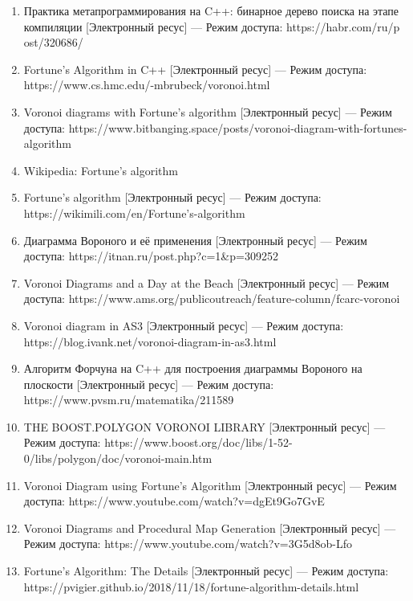 \documentclass[ a4paper]{article}
\begin{document}
\begin{enumerate}
\item Практика метапрограммирования на C++: бинарное дерево поиска на этапе компиляции [Электронный ресус] — Режим доступа: https://habr.com/ru/p ost/320686/
\item Fortune's Algorithm in C++ [Электронный ресус] — Режим доступа: https://www.cs.hmc.edu/-mbrubeck/voronoi.html
\item Voronoi diagrams with Fortune's algorithm  [Электронный ресус] — Режим доступа: https://www.bitbanging.space/posts/voronoi-diagram-with-fortunes-algorithm
\item Wikipedia: Fortune's algorithm
\item Fortune's algorithm  [Электронный ресус] — Режим доступа: https://wikimili.com/en/Fortune's-algorithm
\item Диаграмма Вороного и её применения [Электронный ресус] — Режим доступа: https://itnan.ru/post.php?c=1&p=309252
\item Voronoi Diagrams and a Day at the Beach [Электронный ресус] — Режим доступа: https://www.ams.org/publicoutreach/feature-column/fcarc-voronoi
\item Voronoi diagram in AS3 [Электронный ресус] — Режим доступа: https://blog.ivank.net/voronoi-diagram-in-as3.html
\item Алгоритм Форчуна на C++ для построения диаграммы Вороного на плоскости [Электронный ресус] — Режим доступа: https://www.pvsm.ru/matematika/211589
\item THE BOOST.POLYGON VORONOI LIBRARY [Электронный ресус] — Режим доступа: https://www.boost.org/doc/libs/1-52-0/libs/polygon/doc/voronoi-main.htm
\item Voronoi Diagram using Fortune's Algorithm [Электронный ресус] — Режим доступа: https://www.youtube.com/watch?v=dgEt9Go7GvE
\item Voronoi Diagrams and Procedural Map Generation [Электронный ресус] — Режим доступа: https://www.youtube.com/watch?v=3G5d8ob-Lfo
\item Fortune's Algorithm: The Details [Электронный ресус] — Режим доступа: https://pvigier.github.io/2018/11/18/fortune-algorithm-details.html
\end{enumerate}
\end{document}
